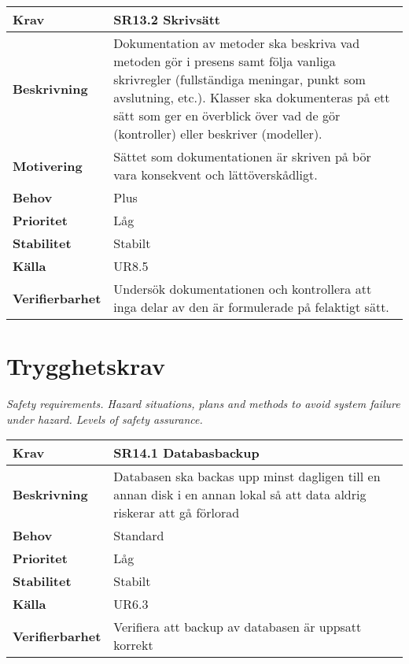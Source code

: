 \documentclass[a4paper, twoside, 11pt, titlepage]{article}
\begin{document}
\begin{tabular} { p{2.6cm} p{12.5cm} }
	\hline
	\sffamily\textbf{Krav} & \sffamily\textbf{SR13.2 Skrivsätt } \\
	\hline
	\sffamily\textbf{Beskrivning} & Dokumentation av metoder ska beskriva vad metoden gör i presens samt följa vanliga skrivregler (fullständiga meningar, punkt som avslutning, etc.). Klasser ska dokumenteras på ett sätt som ger en överblick över vad de gör (kontroller) eller beskriver (modeller).  \\
	\hline
	\sffamily\textbf{Motivering} & Sättet som dokumentationen är skriven på bör vara konsekvent och lättöverskådligt.  \\
	\hline
	\sffamily\textbf{Behov} & Plus  \\
	\hline
	\sffamily\textbf{Prioritet} & Låg  \\
	\hline
	\sffamily\textbf{Stabilitet} & Stabilt  \\
	\hline
	\sffamily\textbf{Källa} & UR8.5  \\
	\hline
	\sffamily\textbf{Verifierbarhet} & Undersök dokumentationen och kontrollera att inga delar av den är formulerade på felaktigt sätt.  \\
	\hline
\end{tabular}


\clearpage
\section{Trygghetskrav}


\emph{Safety requirements. Hazard situations, plans and methods to avoid system failure under hazard. Levels of safety assurance.}

\begin{tabular} { p{2.6cm} p{12.5cm} }
	\hline
	\sffamily\textbf{Krav} & \sffamily\textbf{SR14.1 Databasbackup } \\
	\hline
	\sffamily\textbf{Beskrivning} & Databasen ska backas upp minst dagligen till en annan disk i en annan lokal så att data aldrig riskerar att gå förlorad  \\
	\hline
	\sffamily\textbf{Behov} & Standard  \\
	\hline
	\sffamily\textbf{Prioritet} & Låg  \\
	\hline
	\sffamily\textbf{Stabilitet} & Stabilt  \\
	\hline
	\sffamily\textbf{Källa} & UR6.3  \\
	\hline
	\sffamily\textbf{Verifierbarhet} & Verifiera att backup av databasen är uppsatt korrekt  \\
	\hline
\end{tabular}
\end{document}
